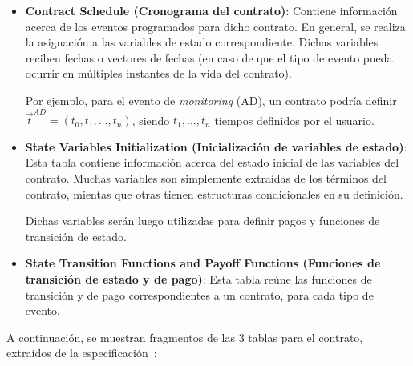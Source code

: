 \documentclass[12pt]{book}
\begin{document}
\begin{itemize}
	\item \textbf{Contract Schedule (Cronograma del contrato)}: Contiene información acerca de los eventos programados para dicho contrato. En general, se realiza la asignación a las variables de estado correspondiente. Dichas variables reciben fechas o vectores de fechas (en caso de que el tipo de evento pueda ocurrir en múltiples instantes de la vida del contrato).

	      Por ejemplo, para el evento de \textit{monitoring} (AD), un contrato podría definir $\vec{t}^{AD} = \left(t_0,t_1, \ldots ,t_n\right)$, siendo $t_1, \ldots, t_n$ tiempos definidos por el usuario.

	\item \textbf{State Variables Initialization (Inicialización de variables de estado)}: Esta tabla contiene información acerca del estado inicial de las variables del contrato. Muchas variables son simplemente extraídas de los términos del contrato, mientas que otras tienen estructuras condicionales en su definición.

	      Dichas variables serán luego utilizadas para definir pagos y funciones de transición de estado.

	\item \textbf{State Transition Functions and Payoff Functions (Funciones de transición de estado y de pago)}:
	      Esta tabla reúne las funciones de transición y de pago correspondientes a un contrato, para cada tipo de evento.


\end{itemize}


A continuación, se muestran fragmentos de las 3 tablas para el contrato, extraídos de la especificación~\cite{ACTUS_Techspecs}:

\begingroup
\fontsize{9pt}{9pt}\selectfont
\end{document}
